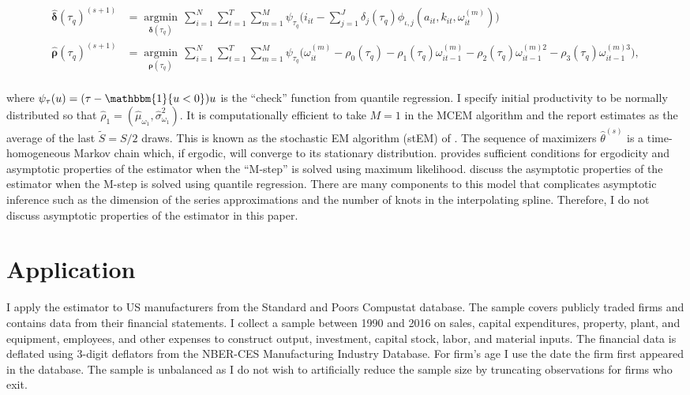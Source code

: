 \documentclass{article}
\begin{document}
\begin{enumerate}
\begin{equation*}
\begin{split}
    \hat{\boldsymbol\delta}(\tau_{q})^{(s+1)}&=\underset{\boldsymbol\delta(\tau_{q})}{\operatorname{argmin}}\,\sum_{i=1}^{N}\sum_{t=1}^{T}\sum_{m=1}^{M}\psi_{\tau_{q}}\bigg(i_{it}-\sum_{j=1}^{J}\delta_{j}(\tau_{q})\phi_{\iota,j}(a_{it}, k_{it}, \omega^{(m)}_{it})\bigg)\\%
    \hat{\boldsymbol\rho}(\tau_{q})^{(s+1)}&=\underset{\boldsymbol\rho(\tau_{q})}{\operatorname{argmin}}\,\sum_{i=1}^{N}\sum_{t=1}^{T}\sum_{m=1}^{M}\psi_{\tau_{q}}\bigg(\omega^{(m)}_{it}-\rho_{0}(\tau_{q})-\rho_{1}(\tau_{q})\omega^{(m)}_{it-1}-\rho_{2}(\tau_{q})\omega^{(m)2}_{it-1}-\rho_{3}(\tau_{q})\omega^{(m)3}_{it-1}\bigg),\\
    \end{split}
    \end{equation*}
\end{enumerate}
where $\psi_{\tau}(u)=(\tau-\mathbbm{1}\{u<0\})u$ is the ``check'' function from quantile regression. I specify initial productivity to be normally distributed so that $\hat{\rho}_{1}=(\hat{\mu}_{\omega_{1}}, \hat{\sigma}_{\omega_{1}}^{2})$. It is computationally efficient to take $M=1$ in the MCEM algorithm and the report estimates as the average of the last $\tilde{S}=S/2$ draws. This is known as the stochastic EM algorithm (stEM) of \cite{sem}. The sequence of maximizers $\hat{\theta}^{(s)}$ is a time-homogeneous Markov chain which, if ergodic, will converge to its stationary distribution. \cite{Nielsen2000} provides sufficient conditions for ergodicity and asymptotic properties of the estimator when the ``M-step'' is solved using maximum likelihood. \cite{Arellano2016} discuss the asymptotic properties of the estimator when the M-step is solved using quantile regression. There are many components to this model that complicates asymptotic inference such as the dimension of the series approximations and the number of knots in the interpolating spline. Therefore, I do not discuss asymptotic properties of the estimator in this paper.

\section{Application} \label{application}
I apply the estimator to US manufacturers from the Standard and Poors Compustat database. The sample covers publicly traded firms and contains data from their financial statements. I collect a sample between 1990 and 2016 on sales, capital expenditures, property, plant, and equipment, employees, and other expenses to construct output, investment, capital stock, labor, and material inputs. The financial data is deflated using 3-digit deflators from the NBER-CES Manufacturing Industry Database. For firm's age I use the date the firm first appeared in the database. The sample is unbalanced as I do not wish to artificially reduce the sample size by truncating observations for firms who exit.
\end{document}

